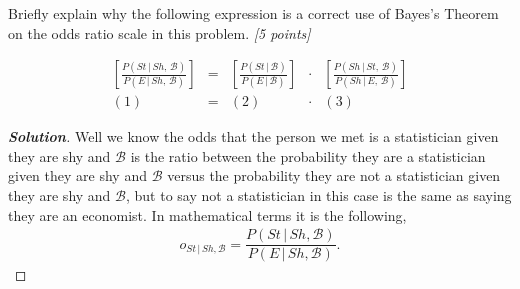 \documentclass[12pt]{article}
\newcommand{\given}{\, | \,}
\newenvironment{solution}{\begin{proof}[\textbf{\textit{Solution}}] }{\end{proof}}
\begin{document}
\begin{itemize}
Briefly explain why the following expression is a correct use of Bayes's Theorem on the odds ratio scale in this problem. \textit{[5 points]} \vspace*{-0.1in}

\begin{center}

\Large

\[
\begin{array}{ccccc}
\left[ \frac{ P ( St \given Sh, \, \mathcal{ B } ) }{ P ( E \given Sh, \, \mathcal{ B } ) } \right] & = & \left[ \frac{ P ( St \given \mathcal{ B } ) }{ P ( E \given \mathcal{ B } ) } \right] & \cdot & \left[ \frac{ P ( Sh \given St, \, \mathcal{ B } ) }{ P ( Sh \given E, \, \mathcal{ B } ) } \right] \\( 1 ) & = & ( 2 ) & \cdot & ( 3 )
\end{array}
\]

\normalsize

\end{center}

\begin{solution}
    Well we know the odds that the person we met is a statistician given they are shy and $\mathcal{B}$ is the ratio between the probability they are a statistician given they are shy and $\mathcal{B}$ versus the probability they are not a statistician given they are shy and $\mathcal{B}$, but to say not a statistician in this case is the same as saying they are an economist. In mathematical terms it is the following, 
    \begin{align}
        o_{St \given Sh, \mathcal{B}} = \dfrac{P(St \given Sh, \mathcal{B})}{P(E \given Sh, \mathcal{B})}.
    \end{align}


\end{solution}
\end{itemize}
\end{document}
